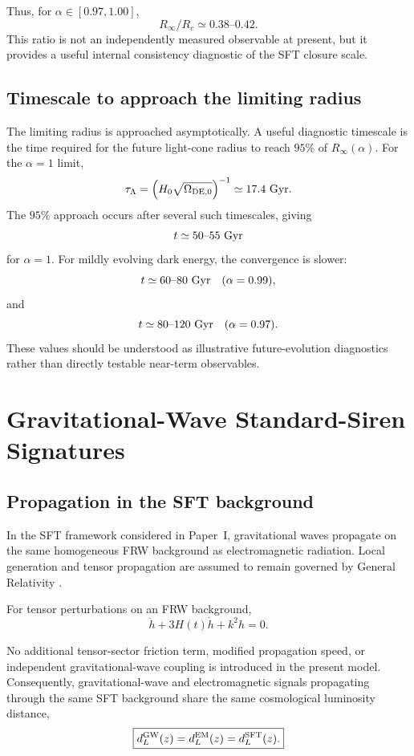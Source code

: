 \documentclass[12pt]{article}
\begin{document}
Thus, for $\alpha\in[0.97,1.00]$,
\begin{equation}
\boxed{
R_\infty/R_c\simeq0.38\text{--}0.42.
}
\label{eq:Rratio_final}
\end{equation}
This ratio is not an independently measured observable at present, but it
provides a useful internal consistency diagnostic of the SFT closure scale.

\subsection{Timescale to approach the limiting radius}

The limiting radius is approached asymptotically. A useful diagnostic timescale
is the time required for the future light-cone radius to reach $95\%$ of
$R_\infty(\alpha)$. For the $\alpha=1$ limit,
\[
\tau_\Lambda=
\left(H_0\sqrt{\Omega_{{\rm DE},0}}\right)^{-1}
\simeq17.4~{\rm Gyr}.
\]
The $95\%$ approach occurs after several such timescales, giving
\[
t\simeq50\text{--}55~{\rm Gyr}
\]
for $\alpha=1$. For mildly evolving dark energy, the convergence is slower:
\[
t\simeq60\text{--}80~{\rm Gyr}
\quad(\alpha=0.99),
\]
and
\[
t\simeq80\text{--}120~{\rm Gyr}
\quad(\alpha=0.97).
\]
These values should be understood as illustrative future-evolution diagnostics
rather than directly testable near-term observables.

\section{Gravitational-Wave Standard-Siren Signatures}
\label{sec:gw_predictions}

\subsection{Propagation in the SFT background}

In the SFT framework considered in Paper~I, gravitational waves
propagate on the same homogeneous FRW background as electromagnetic
radiation. Local generation and tensor propagation are assumed to
remain governed by General Relativity
\cite{Maggiore2020,Abbott2017GW}.

For tensor perturbations on an FRW background,
\begin{equation}
\ddot{h}+3H(t)\dot{h}+k^2h=0.
\end{equation}

No additional tensor-sector friction term, modified propagation speed,
or independent gravitational-wave coupling is introduced in the
present model. Consequently, gravitational-wave and electromagnetic
signals propagating through the same SFT background share the same
cosmological luminosity distance,
\begin{equation}
\boxed{
d_L^{\rm GW}(z)
=
d_L^{\rm EM}(z)
=
d_L^{\rm SFT}(z).
}
\label{eq:dLGW}
\end{equation}
\end{document}
